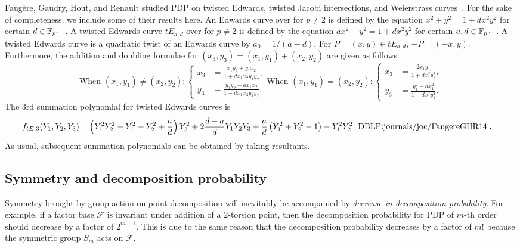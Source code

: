 Faug\`ere, Gaudry, Hout, and Renault studied PDP on twisted Edwards,
twisted Jacobi intersections, and Weierstrass
curves~\cite{DBLP:journals/joc/FaugereGHR14}.
%
For the sake of completeness, we include some of their results here.
%
An Edwards curve over  for $p\neq 2$ is defined by the equation
$x^2+y^2=1+dx^2y^2$ for certain
$d\in\mathbb F_{p^n}$~\cite{DBLP:journals/iacr/BernsteinL07}.
%
A twisted Edwards curve $tE_{a,d}$ over  for $p\neq 2$ is
defined by the equation $ax^2+y^2=1+dx^2y^2$ for certain
$a,d\in\mathbb F_{p^n}$~\cite{DBLP:journals/iacr/BernsteinBJLP08}.
%
A twisted Edwards curve is a quadratic twist of an Edwards curve by
$a_0=1/(a-d)$.
%
For $P=(x,y)\in tE_{a,d}$, $-P=(-x,y)$.
%
Furthermore, the addition and doubling formulae for
$(x_3,y_3)=(x_1,y_1)+(x_2,y_2)$ are given as follows.
%
\[ \text{When }(x_1,y_1)\neq (x_2,y_2):\left\{\begin{aligned}
      x_3 & = \frac{x_1y_2 + y_1x_2}{1 + dx_1x_2y_1y_2}, \\
      y_3 & = \frac{y_1y_2 - ax_1x_2}{1 - dx_1x_2y_1y_2}.
    \end{aligned}\right. \text{When
  }(x_1,y_1)=(x_2,y_2):\left\{\begin{aligned}
      x_3 & = \frac{2x_1y_1}{1 + dx_1^2y_1^2}, \\
      y_3 & = \frac{y_1^2 - ax_1^2}{1 - dx_1^2y_1^2}.
    \end{aligned}\right. \]
%
The 3rd summation polynomial for twisted Edwards curves is
%
\begin{align*}
  f_{tE, 3}(Y_1,Y_2,Y_3) = & \left(Y_1^2Y_2^2 - Y_1^2 - Y_2^2 +
                             \frac{a}{d}\right)Y_3^2  +
                             2\frac{d-a}{d}Y_1Y_2Y_3 +
                             \frac{a}{d}\left(Y_1^2 + Y_2^2 - 1\right)
                             - Y_1^2Y_2^2~\cite{DBLP:journals/joc/FaugereGHR14}.
\end{align*}
%
As usual, subsequent summation polynomials can be obtained by taking
resultants.



\subsection{Symmetry and decomposition probability}
\label{sec:symmetry-decomposition-probability}

Symmetry brought by group action on point decomposition will
inevitably be accompanied by \emph{decrease in decomposition
  probability}.
%
For example, if a factor base $\mathcal F$ is invariant under addition
of a 2-torsion point, then the decomposition probability for PDP of
$m$-th order should decrease by a factor of $2^{m-1}$.
%
This is due to the same reason that the decomposition probability
decreases by a factor of $m!$ because the symmetric group $S_m$ acts
on $\mathcal F$.

